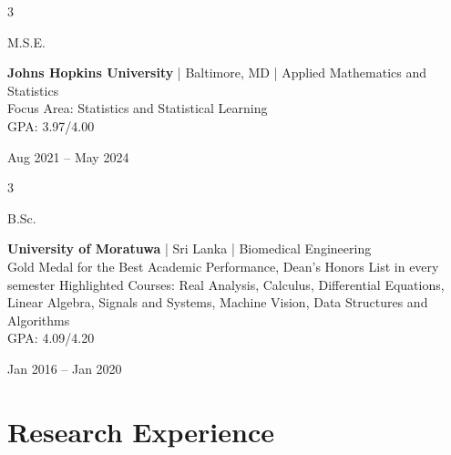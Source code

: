 \documentclass[10pt, letterpaper]{article}
\newenvironment{threecolentry}[3][]{
    \onecolentry
    \def\thirdColumn{#3}
    \setcolumnwidth{1cm, \fill, 3.5 cm}
    \begin{paracol}{3}
    {\raggedright #2} \switchcolumn
}{
    \switchcolumn \raggedleft \thirdColumn
    \end{paracol}
    \endonecolentry
} %
\begin{document}
        \vspace{0.20 cm}

        \begin{threecolentry}{M.S.E.}{Aug 2021 -- May 2024}
        \textbf{Johns Hopkins University} | Baltimore, MD | Applied Mathematics and Statistics \\
        Focus Area: Statistics and Statistical Learning \\
        GPA: 3.97/4.00
        \end{threecolentry}

        \vspace{0.20 cm}

        \begin{threecolentry}{B.Sc.}{Jan 2016 -- Jan 2020}
        \textbf{University of Moratuwa} | Sri Lanka | Biomedical Engineering \\
        Gold Medal for the Best Academic Performance, Dean's Honors List in every semester
        Highlighted Courses: Real Analysis, Calculus, Differential Equations, Linear Algebra, Signals and Systems, Machine Vision, Data Structures and Algorithms \\
        GPA: 4.09/4.20
        \end{threecolentry}

    
    \section{Research Experience}
\end{document}
